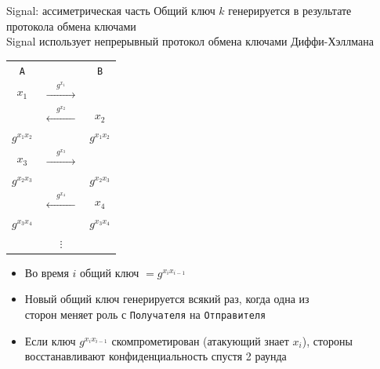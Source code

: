\documentclass[usenames,dvipsnames,8pt,aspectratio=169]{beamer}
\begin{document}
\begin{frame}{Signal: ассиметрическая часть}
	\Large Общий ключ $k$ генерируется в результате протокола обмена ключами\\
	Signal использует {\color{Orange} непрерывный протокол обмена ключами} Диффи-Хэллмана
	 
	\begin{center}
		\begin{tabular}{c c c }
			{\LARGE \color{Orange}\texttt{A}}&    & {\LARGE \color{Orange}\texttt{B}}  \\[2pt]
			$x_1 $& $\xrightarrow{\hspace{15pt} g^{x_1} \hspace{15pt}}$ & \\[5pt]
			& $\xleftarrow{\hspace{15pt} g^{x_2} \hspace{15pt}}$ & $x_2$ \\
			{\color{Orange}$g^{x_1x_2}$} & & {\color{Orange}$g^{x_1x_2}$} \pause \\[5pt]
			$x_3 $& $\xrightarrow{\hspace{15pt} g^{x_3} \hspace{15pt}}$ & \\
			{\color{Orange}$g^{x_2x_3}$} & & {\color{Orange}$g^{x_2x_3}$ }\\[5pt]
			& $\xleftarrow{\hspace{15pt} g^{x_4} \hspace{15pt}}$ & $x_4$  \\
			{\color{Orange}$g^{x_3x_4}$} & & {\color{Orange}$g^{x_3x_4}$ }\\
			& $\vdots $& \\
		\end{tabular}
	\end{center}
\vspace{-10pt}
\normalfont
\begin{itemize}
	\item Во время $i$ общий ключ $ = g^{x_i x_{i-1}}$
	\item Новый общий ключ генерируется всякий раз, когда одна из \\ сторон меняет роль с {\color{Orange}\texttt{Получателя}} на {\color{Orange}\texttt{Отправителя}} 
	\item Если ключ $g^{x_i x_{i-1}}$ скомпрометирован (атакующий знает $x_i$), стороны восстанавливают конфиденциальность спустя 2 раунда
\end{itemize}
	
\end{frame}
\end{document}
